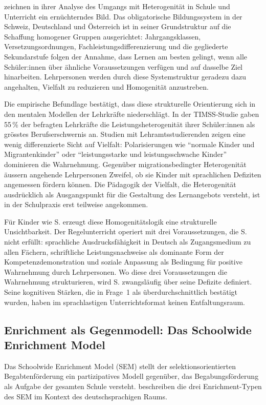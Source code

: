 \documentclass[ngerman, a4paper]{article}
\begin{document}
\textcite{buholzer2010allegleich} zeichnen in ihrer Analyse des Umgangs mit Heterogenität
in Schule und Unterricht ein ernüchterndes Bild. Das obligatorische Bildungssystem in
der Schweiz, Deutschland und Österreich ist in seiner Grundstruktur auf die Schaffung
homogener Gruppen ausgerichtet: Jahrgangsklassen, Versetzungsordnungen,
Fachleistungsdifferenzierung und die gegliederte Sekundarstufe folgen der Annahme,
dass Lernen am besten gelingt, wenn alle Schüler:innen über ähnliche Voraussetzungen
verfügen und auf dasselbe Ziel hinarbeiten. Lehrpersonen werden durch diese
Systemstruktur geradezu dazu angehalten, Vielfalt zu reduzieren und Homogenität
anzustreben.

Die empirische Befundlage bestätigt, dass diese strukturelle Orientierung sich in den
mentalen Modellen der Lehrkräfte niederschlägt. In der TIMSS-Studie gaben 55\,\%
der befragten Lehrkräfte die Leistungsheterogenität ihrer Schüler:innen als grösstes
Berufserschwernis an. Studien mit Lehramtsstudierenden zeigen eine wenig differenzierte
Sicht auf Vielfalt: Polarisierungen wie \enquote{normale Kinder und Migrantenkinder} oder
\enquote{leistungsstarke und leistungsschwache Kinder} dominieren die Wahrnehmung.
Gegenüber migrationsbedingter Heterogenität äussern angehende Lehrpersonen Zweifel,
ob sie Kinder mit sprachlichen Defiziten angemessen fördern können. Die Pädagogik
der Vielfalt, die Heterogenität ausdrücklich als Ausgangspunkt für die Gestaltung
des Lernangebots versteht, ist in der Schulpraxis erst teilweise angekommen.

Für Kinder wie S. erzeugt diese Homogenitätslogik eine strukturelle Unsichtbarkeit.
Der Regelunterricht operiert mit drei Voraussetzungen, die S. nicht erfüllt: sprachliche
Ausdrucksfähigkeit in Deutsch als Zugangsmedium zu allen Fächern, schriftliche
Leistungsnachweise als dominante Form der Kompetenzdemonstration und soziale
Anpassung als Bedingung für positive Wahrnehmung durch Lehrpersonen. Wo diese drei
Voraussetzungen die Wahrnehmung strukturieren, wird S. zwangsläufig über seine Defizite
definiert. Seine kognitiven Stärken, die in Frage~1 als überdurchschnittlich bestätigt
wurden, haben im sprachlastigen Unterrichtsformat keinen Entfaltungsraum.

\subsection{Enrichment als Gegenmodell: Das Schoolwide Enrichment Model}

Das Schoolwide Enrichment Model (SEM) stellt der selektionsorientierten
Begabtenförderung ein partizipatives Modell gegenüber, das Begabungsförderung
als Aufgabe der gesamten Schule versteht. \textcite[S.\,444--454]{renzullireis2021rls} beschreiben die
drei Enrichment-Typen des SEM im Kontext des deutschsprachigen Raums.
\end{document}
